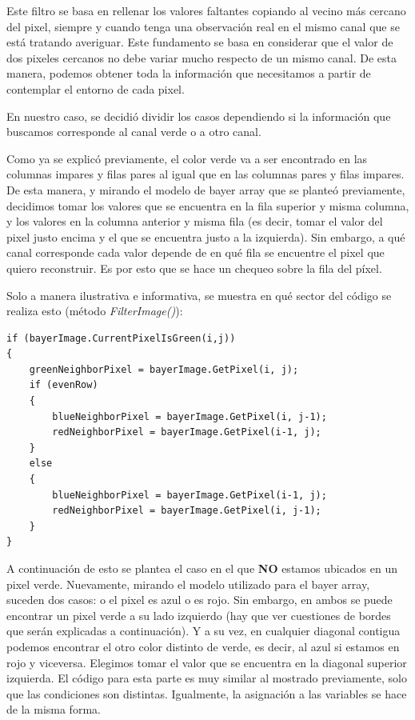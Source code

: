 Este filtro se basa en rellenar los valores faltantes copiando al vecino más
cercano del pixel, siempre y cuando tenga una observación real en el mismo canal que se está tratando averiguar. Este fundamento se basa en considerar que el valor de dos pixeles cercanos no debe variar mucho respecto de un mismo canal. De esta manera, podemos obtener toda la información que necesitamos a partir de contemplar el entorno de cada pixel.
\par 
En nuestro caso, se decidió dividir los casos dependiendo si la información que buscamos corresponde al canal verde o a otro canal.
\par 
Como ya se explicó previamente, el color verde va a ser encontrado en las columnas impares y filas pares al igual que en las columnas pares y filas impares. De esta manera, y mirando el modelo de bayer array que se planteó previamente, decidimos tomar los valores que se encuentra en la fila superior y misma columna, y los valores en la columna anterior y misma fila (es decir, tomar el valor del pixel justo encima y el que se encuentra justo a la izquierda). Sin embargo, a qué canal corresponde cada valor depende de en qué fila se encuentre el pixel que quiero reconstruir. Es por esto que se hace un chequeo sobre la fila del píxel.
\par 
Solo a manera ilustrativa e informativa, se muestra en qué sector del código se realiza esto (método \textit{FilterImage()}): 
\begin{lstlisting}
if (bayerImage.CurrentPixelIsGreen(i,j))
{
	greenNeighborPixel = bayerImage.GetPixel(i, j);
	if (evenRow)
	{
		blueNeighborPixel = bayerImage.GetPixel(i, j-1);
		redNeighborPixel = bayerImage.GetPixel(i-1, j);
	} 
	else
	{
		blueNeighborPixel = bayerImage.GetPixel(i-1, j);
		redNeighborPixel = bayerImage.GetPixel(i, j-1);
	}
}
\end{lstlisting}
\par 
A continuación de esto se plantea el caso en el que \textbf{NO} estamos ubicados en un pixel verde. Nuevamente, mirando el modelo utilizado para el bayer array, suceden dos casos: o el pixel es azul o es rojo. Sin embargo, en ambos se puede encontrar un pixel verde a su lado izquierdo (hay que ver cuestiones de bordes que serán explicadas a continuación). Y a su vez, en cualquier diagonal contigua podemos encontrar el otro color distinto de verde, es decir, al azul si estamos en rojo y viceversa. Elegimos tomar el valor que se encuentra en la diagonal superior izquierda. El código para esta parte es muy similar al mostrado previamente, solo que las condiciones son distintas. Igualmente, la asignación a las variables se hace de la misma forma.

